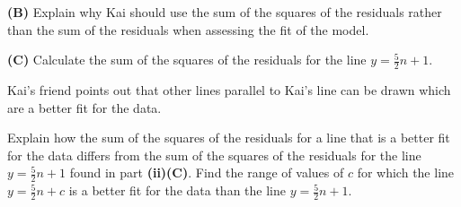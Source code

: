 {\begin{qparts}
\textbf{(B)} Explain why Kai should use the sum of the squares of the residuals rather than the sum of the residuals when assessing the fit of the model. \par
\textbf{(C)} Calculate the sum of the squares of the residuals for the line $y=\frac52n+1$. 
\end{qparts}
Kai's friend points out that other lines parallel to Kai's line can be drawn which are a better fit for the data.
\begin{qparts}
 Explain how the sum of the squares of the residuals for a line that is a better fit for the data differs from the sum of the squares of the residuals for the line $y=\frac52n+1$ found in part \textbf{(ii)(C)}. 
 Find the range of values of $c$ for which the line $y=\frac52n+c$ is a better fit for the data than the line $y=\frac52n+1$. 
\end{qparts}
}
